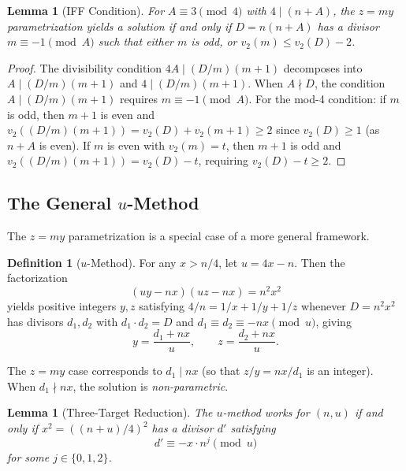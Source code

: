 \documentclass[11pt,a4paper]{article}
\theoremstyle{plain}
\newtheorem{lemma}[theorem]{Lemma}
\theoremstyle{plain}
\theoremstyle{definition}
\newtheorem{definition}[theorem]{Definition}
\numberwithin{equation}{section}
\begin{document}
\begin{lemma}[IFF Condition]\label{lem:iff}
For $A \equiv 3 \pmod{4}$ with $4 \mid (n+A)$, the $z = my$ parametrization yields a solution if and only if $D = n(n+A)$ has a divisor $m \equiv -1 \pmod{A}$ such that either $m$ is odd, or $v_2(m) \leq v_2(D) - 2$.
\end{lemma}

\begin{proof}
The divisibility condition $4A \mid (D/m)(m+1)$ decomposes into $A \mid (D/m)(m+1)$ and $4 \mid (D/m)(m+1)$. When $A \nmid D$, the condition $A \mid (D/m)(m+1)$ requires $m \equiv -1 \pmod{A}$. For the mod-4 condition: if $m$ is odd, then $m + 1$ is even and $v_2((D/m)(m+1)) = v_2(D) + v_2(m+1) \geq 2$ since $v_2(D) \geq 1$ (as $n + A$ is even). If $m$ is even with $v_2(m) = t$, then $m + 1$ is odd and $v_2((D/m)(m+1)) = v_2(D) - t$, requiring $v_2(D) - t \geq 2$.
\end{proof}

\subsection{The General $u$-Method}

The $z = my$ parametrization is a special case of a more general framework.

\begin{definition}[$u$-Method]
For any $x > n/4$, let $u = 4x - n$. Then the factorization
\begin{equation}\label{eq:u-method}
(uy - nx)(uz - nx) = n^2 x^2
\end{equation}
yields positive integers $y, z$ satisfying $4/n = 1/x + 1/y + 1/z$ whenever $D = n^2 x^2$ has divisors $d_1, d_2$ with $d_1 \cdot d_2 = D$ and $d_1 \equiv d_2 \equiv -nx \pmod{u}$, giving
\begin{equation}
y = \frac{d_1 + nx}{u}, \qquad z = \frac{d_2 + nx}{u}.
\end{equation}
\end{definition}

The $z = my$ case corresponds to $d_1 \mid nx$ (so that $z/y = nx/d_1$ is an integer). When $d_1 \nmid nx$, the solution is \emph{non-parametric}.

\begin{lemma}[Three-Target Reduction]\label{lem:three-target}
The $u$-method works for $(n, u)$ if and only if $x^2 = ((n+u)/4)^2$ has a divisor $d'$ satisfying
\begin{equation}
d' \equiv -x \cdot n^j \pmod{u}
\end{equation}
for some $j \in \{0, 1, 2\}$.
\end{lemma}
\end{document}
